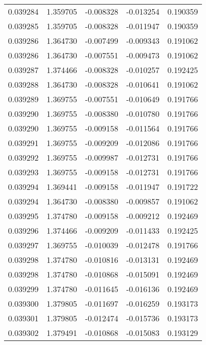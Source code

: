 \begin{tabular}{lrrrr}
0.039284    &  1.359705 & -0.008328 & -0.013254 &             0.190359 \\
0.039285    &  1.359705 & -0.008328 & -0.011947 &             0.190359 \\
0.039286    &  1.364730 & -0.007499 & -0.009343 &             0.191062 \\
0.039286    &  1.364730 & -0.007551 & -0.009473 &             0.191062 \\
0.039287    &  1.374466 & -0.008328 & -0.010257 &             0.192425 \\
0.039288    &  1.364730 & -0.008328 & -0.010641 &             0.191062 \\
0.039289    &  1.369755 & -0.007551 & -0.010649 &             0.191766 \\
0.039290    &  1.369755 & -0.008380 & -0.010780 &             0.191766 \\
0.039290    &  1.369755 & -0.009158 & -0.011564 &             0.191766 \\
0.039291    &  1.369755 & -0.009209 & -0.012086 &             0.191766 \\
0.039292    &  1.369755 & -0.009987 & -0.012731 &             0.191766 \\
0.039293    &  1.369755 & -0.009158 & -0.012731 &             0.191766 \\
0.039294    &  1.369441 & -0.009158 & -0.011947 &             0.191722 \\
0.039294    &  1.364730 & -0.008380 & -0.009857 &             0.191062 \\
0.039295    &  1.374780 & -0.009158 & -0.009212 &             0.192469 \\
0.039296    &  1.374466 & -0.009209 & -0.011433 &             0.192425 \\
0.039297    &  1.369755 & -0.010039 & -0.012478 &             0.191766 \\
0.039298    &  1.374780 & -0.010816 & -0.013131 &             0.192469 \\
0.039298    &  1.374780 & -0.010868 & -0.015091 &             0.192469 \\
0.039299    &  1.374780 & -0.011645 & -0.016136 &             0.192469 \\
0.039300    &  1.379805 & -0.011697 & -0.016259 &             0.193173 \\
0.039301    &  1.379805 & -0.012474 & -0.015736 &             0.193173 \\
0.039302    &  1.379491 & -0.010868 & -0.015083 &             0.193129 \\

\end{tabular}
